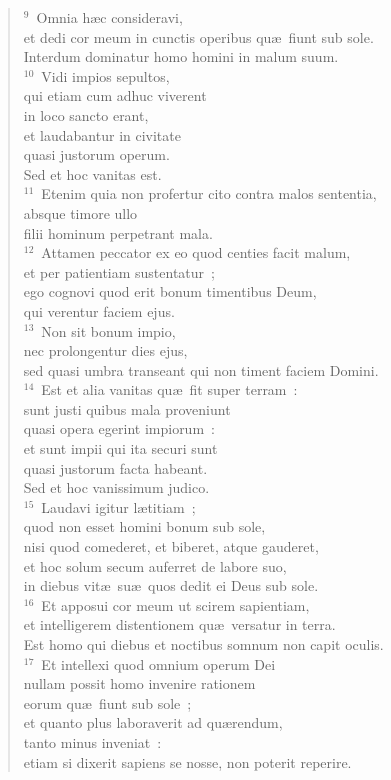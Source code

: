 \begin{verse}${}^{9}$~Omnia h\ae c consideravi,\\ et dedi cor meum in cunctis operibus qu\ae\ fiunt sub sole.\\ Interdum dominatur homo homini in malum suum.\\
${}^{10}$~Vidi impios sepultos,\\ qui etiam cum adhuc viverent\\ in loco sancto erant,\\ et laudabantur in civitate\\ quasi justorum operum.\\ Sed et hoc vanitas est.\\
${}^{11}$~Etenim quia non profertur cito contra malos sententia,\\ absque timore ullo\\ filii hominum perpetrant mala.\\
${}^{12}$~Attamen peccator ex eo quod centies facit malum,\\ et per patientiam sustentatur~;\\ ego cognovi quod erit bonum timentibus Deum,\\ qui verentur faciem ejus.\\
${}^{13}$~Non sit bonum impio,\\ nec prolongentur dies ejus,\\ sed quasi umbra transeant qui non timent faciem Domini.\\
${}^{14}$~Est et alia vanitas qu\ae\ fit super terram~:\\ sunt justi quibus mala proveniunt\\ quasi opera egerint impiorum~:\\ et sunt impii qui ita securi sunt\\ quasi justorum facta habeant.\\ Sed et hoc vanissimum judico.\\
${}^{15}$~Laudavi igitur l\ae titiam~;\\ quod non esset homini bonum sub sole,\\ nisi quod comederet, et biberet, atque gauderet,\\ et hoc solum secum auferret de labore suo,\\ in diebus vit\ae\ su\ae\ quos dedit ei Deus sub sole.\\
${}^{16}$~Et apposui cor meum ut scirem sapientiam,\\ et intelligerem distentionem qu\ae\ versatur in terra.\\ Est homo qui diebus et noctibus somnum non capit oculis.\\
${}^{17}$~Et intellexi quod omnium operum Dei\\ nullam possit homo invenire rationem\\ eorum qu\ae\ fiunt sub sole~;\\ et quanto plus laboraverit ad qu\ae rendum,\\ tanto minus inveniat~:\\ etiam si dixerit sapiens se nosse, non poterit reperire.\end{verse}


